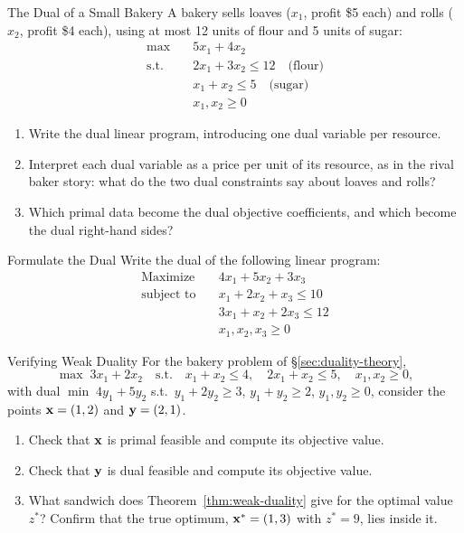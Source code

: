 \begin{ex}{The Dual of a Small Bakery}{}
\label{ex:dual-2x2-warmup}
 A bakery sells loaves ($x_1$, profit \$5 each) and rolls ($x_2$, profit \$4 each), using at most 12 units of flour and 5 units of sugar:
\[
\begin{aligned}
\max \quad & 5x_1 + 4x_2 \\
\text{s.t.} \quad & 2x_1 + 3x_2 \leq 12 \quad \text{(flour)} \\
& x_1 + x_2 \leq 5 \quad \text{(sugar)} \\
& x_1, x_2 \geq 0
\end{aligned}
\]
\begin{enumerate}
\item Write the dual linear program, introducing one dual variable per resource.
\item Interpret each dual variable as a price per unit of its resource, as in the rival baker story: what do the two dual constraints say about loaves and rolls?
\item Which primal data become the dual objective coefficients, and which become the dual right-hand sides?
\end{enumerate}
\exrefs{\S\ref{sec:duality-theory}}
\end{ex}

\begin{ex}{Formulate the Dual}{}
\label{ex:formulate-dual}
 Write the dual of the following linear program:
\[
\begin{aligned}
\text{Maximize} \quad & 4x_1 + 5x_2 + 3x_3 \\
\text{subject to} \quad
& x_1 + 2x_2 + x_3 \leq 10 \\
& 3x_1 + x_2 + 2x_3 \leq 12 \\
& x_1, x_2, x_3 \geq 0
\end{aligned}
\]
\exrefs{\S\ref{sec:duality-theory}, \S\ref{sec:duality-strong}}
\end{ex}

\begin{ex}{Verifying Weak Duality}{}
\label{ex:weak-duality-check}
 For the bakery problem of \S\ref{sec:duality-theory},
\[
\max \; 3x_1 + 2x_2 \quad \text{s.t.} \quad x_1 + x_2 \leq 4, \quad 2x_1 + x_2 \leq 5, \quad x_1, x_2 \geq 0,
\]
with dual $\min \; 4y_1 + 5y_2$ s.t.\ $y_1 + 2y_2 \geq 3$, $y_1 + y_2 \geq 2$, $y_1, y_2 \geq 0$, consider the points $\mathbf{x} = (1, 2)$ and $\mathbf{y} = (2, 1)$.
\begin{enumerate}
\item Check that $\mathbf{x}$ is primal feasible and compute its objective value.
\item Check that $\mathbf{y}$ is dual feasible and compute its objective value.
\item What sandwich does Theorem~\ref{thm:weak-duality} give for the optimal value $z^*$? Confirm that the true optimum, $\mathbf{x}^* = (1,3)$ with $z^* = 9$, lies inside it.
\end{enumerate}
\end{ex}

